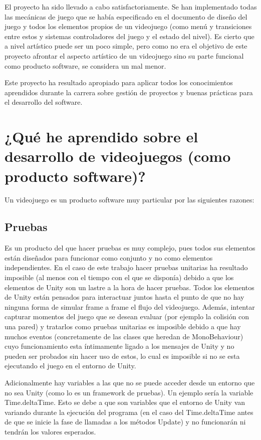 
El proyecto ha sido llevado a cabo satisfactoriamente. Se han implementado todas las mecánicas de juego que se había especificado en el documento de diseño del juego y todos los elementos propios de un videojuego (como menú y transiciones entre estos y sistemas controladores del juego y el estado del nivel). Es cierto que a nivel artístico puede ser un poco simple, pero como no era el objetivo de este proyecto afrontar el aspecto artístico de un videojuego sino su parte funcional como producto software, se considera un mal menor.

Este proyecto ha resultado apropiado para aplicar todos los conocimientos aprendidos durante la carrera sobre gestión de proyectos y buenas prácticas para el desarrollo del software. 

\section{¿Qué he aprendido sobre el desarrollo de videojuegos (como producto software)?}
Un videojuego es un producto software muy particular por las siguientes razones:

\subsection{Pruebas}
Es un producto del que hacer pruebas es muy complejo, pues todos sus elementos están diseñados para funcionar como conjunto y no como elementos independientes. En el caso de este trabajo hacer pruebas unitarias ha resultado imposible (al menos con el tiempo con el que se disponía) debido a que los elementos de Unity son un lastre a la hora de hacer pruebas. Todos los elementos de Unity están pensados para interactuar juntos hasta el punto de que no hay ninguna forma de simular frame a frame el flujo del videojuego. Además, intentar capturar momentos del juego que se desean evaluar (por ejemplo la colisión con una pared) y tratarlos como pruebas unitarias es imposible debido a que hay muchos eventos (concretamente de las clases que heredan de MonoBehaviour) cuyo funcionamiento esta íntimamente ligado a los mensajes de Unity y no pueden ser probados sin hacer uso de estos, lo cual es imposible si no se esta ejecutando el juego en el entorno de Unity.

Adicionalmente hay variables a las que no se puede acceder desde un entorno que no sea Unity (como lo es un framework de pruebas). Un ejemplo sería la variable Time.deltaTime. Esto se debe a que son variables que el entorno de Unity van variando durante la ejecución del programa (en el caso del Time.deltaTime antes de que se inicie la fase de llamadas a los métodos Update) y no funcionarán ni tendrán los valores esperados.

